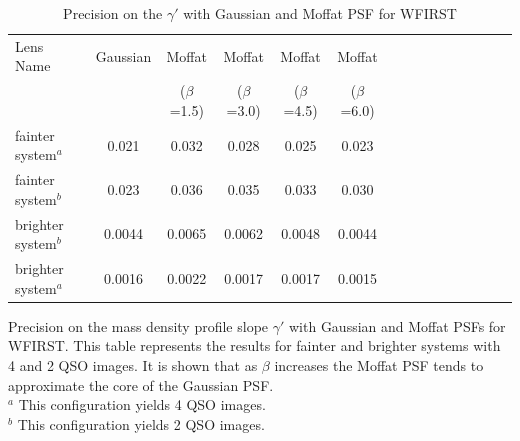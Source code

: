\documentclass[a4paper,11pt]{article}
\begin{document}
\begin{table}\footnotesize
\begin{center}
\caption{Precision on the $\gamma'$ with Gaussian and Moffat PSF for WFIRST}
\begin{tabular}{lcccccccccccccc|}
\hline \hline
Lens Name & Gaussian & Moffat & Moffat & Moffat & Moffat
\\
& & ($\beta$=1.5) & ($\beta$=3.0) & ($\beta$=4.5) & ($\beta$=6.0) \\
\hline
fainter system$^a$ & 0.021 & 0.032 & 0.028 & 0.025 & 0.023 \\
fainter system$^b$ & 0.023 & 0.036 & 0.035 & 0.033 & 0.030 \\
brighter system$^b$ & 0.0044 & 0.0065 & 0.0062 & 0.0048 & 0.0044 \\
brighter system$^a$ & 0.0016 & 0.0022 & 0.0017 & 0.0017 & 0.0015 \\
\hline
\hline
\end{tabular}
\begin{tablenotes}
\item
Precision on the mass density profile slope $\gamma'$ with Gaussian and Moffat PSFs for WFIRST. This table represents the results for fainter and brighter systems with 4 and 2 QSO images. It is shown that as $\beta$ increases the Moffat PSF tends to approximate the core of the Gaussian PSF. \\
$^a$ This configuration yields 4 QSO images. \\
$^b$ This configuration yields 2 QSO images. \\
\label{tab:moffat}
\end{tablenotes}
\end{center}
\end{table}
\end{document}
